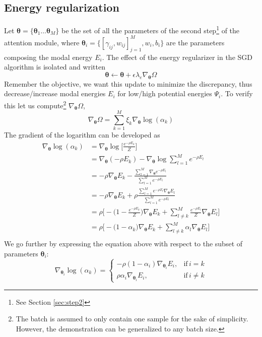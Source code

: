 \subsection*{Energy regularization}
Let $\bm{\theta} = \{\bm{\theta}_1\ldots\bm{\theta}_M\}$ be the set of all the parameters of the second step\footnote{See Section \ref{sec:step2}} of the attention module, where $\bm{\theta}_i = \{[\gamma_{ij}, w_{ij}]_{j=1}^M, w_i, b_i\}$ are the parameters composing the modal energy $E_i$. The effect of the energy regularizer in the SGD algorithm is isolated and written
\begin{equation}
\bm{\theta} \leftarrow \bm{\theta} + \epsilon\lambda_e\nabla_{\bm{\theta}}\Omega
\label{eq:update}
\end{equation}
Remember the objective, we want this update to minimize the discrepancy, thus decrease/increase modal energies $E_i$ for low/high potential energies $\Psi_i$. To verify this let us compute\footnote{The batch is assumed to only contain one sample for the sake of simplicity. However, the demonstration can be generalized to any batch size.} $\nabla_{\bm{\theta}}\Omega$,
\begin{equation}
\nabla_{\bm{\theta}} \Omega =\sum_{k=1}^M \xi_k \nabla_{\bm{\theta}} \log(\alpha_k) 
\label{eq:dev}
\end{equation}
The gradient of the logarithm can be developed as
\begin{equation}
\begin{split}  
\nabla_{\bm{\theta}}  \log(\alpha_k) &= \nabla_{\bm{\theta}} \log \bigg[ \frac{e^{-\rho E_k}}{Z} \bigg] \\
&=  \nabla_{\bm{\theta}}(-\rho E_k) -  \nabla_{\bm{\theta}} \log \sum_{l=1}^M e^{-\rho E_l} \\
&=  -\rho \nabla_{\bm{\theta}}E_k - \frac{\sum_{l=1}^M \nabla_{\bm{\theta}} e^{-\rho E_l}}{\sum_{l=1}^M e^{-\rho E_l}} \\
&= -\rho \nabla_{\bm{\theta}}E_k + \rho \frac{\sum_{l=1}^M e^{-\rho E_l} \nabla_{\bm{\theta}}E_l}{\sum_{l=1}^M e^{-\rho E_l}} \\
&= \rho \Bigg[ -\big(1 - \frac{e^{-\rho E_k}}{Z}\big)\nabla_{\bm{\theta}}E_k + \sum_{l \neq k}^M \frac{e^{-\rho E_l}}{Z} \nabla_{\bm{\theta}}E_l \Bigg] \\
&= \rho \Bigg[ -\big(1 - \alpha_k\big)\nabla_{\bm{\theta}}E_k + \sum_{l \neq k}^M \alpha_l \nabla_{\bm{\theta}}E_l \Bigg] \\
\end{split}
\label{eq:grad-log}
\end{equation}
We go further by expressing the equation above with respect to the subset of parameters $\bm{\theta}_i$:
\begin{equation}
\nabla_{\bm{\theta}_i}  \log(\alpha_k) = \begin{cases}
      -\rho(1-\alpha_i)\nabla_{\bm{\theta}_i}E_i, & \text{if}\, i = k \\
       \rho\alpha_i\nabla_{\bm{\theta}_i}E_i, & \text{if}\, i \neq k
    \end{cases}
\label{eq:log-split}
\end{equation}

